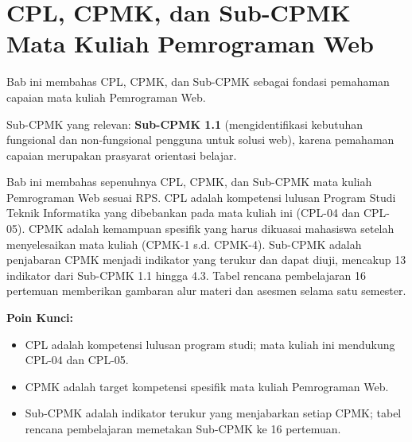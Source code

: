 \documentclass[../main.tex]{subfiles}
\begin{document}
\chapter{CPL, CPMK, dan Sub-CPMK Mata Kuliah Pemrograman Web}

\begin{subcpmk}
  \item Bab ini membahas CPL, CPMK, dan Sub-CPMK sebagai fondasi pemahaman capaian mata kuliah Pemrograman Web.
  \item Sub-CPMK yang relevan: \textbf{Sub-CPMK 1.1} (mengidentifikasi kebutuhan fungsional dan non-fungsional pengguna untuk solusi web), karena pemahaman capaian merupakan prasyarat orientasi belajar.
\end{subcpmk}






\begin{rangkuman}
Bab ini membahas sepenuhnya CPL, CPMK, dan Sub-CPMK mata kuliah Pemrograman Web sesuai RPS. CPL adalah kompetensi lulusan Program Studi Teknik Informatika yang dibebankan pada mata kuliah ini (CPL-04 dan CPL-05). CPMK adalah kemampuan spesifik yang harus dikuasai mahasiswa setelah menyelesaikan mata kuliah (CPMK-1 s.d. CPMK-4). Sub-CPMK adalah penjabaran CPMK menjadi indikator yang terukur dan dapat diuji, mencakup 13 indikator dari Sub-CPMK 1.1 hingga 4.3. Tabel rencana pembelajaran 16 pertemuan memberikan gambaran alur materi dan asesmen selama satu semester.

\textbf{Poin Kunci:}
\begin{itemize}
  \item CPL adalah kompetensi lulusan program studi; mata kuliah ini mendukung CPL-04 dan CPL-05.
  \item CPMK adalah target kompetensi spesifik mata kuliah Pemrograman Web.
  \item Sub-CPMK adalah indikator terukur yang menjabarkan setiap CPMK; tabel rencana pembelajaran memetakan Sub-CPMK ke 16 pertemuan.
\end{itemize}
\end{rangkuman}

\ifSubfilesClassLoaded{
  \renewcommand{\bibname}{Daftar Pustaka}
  
  
}{}
\end{document}
